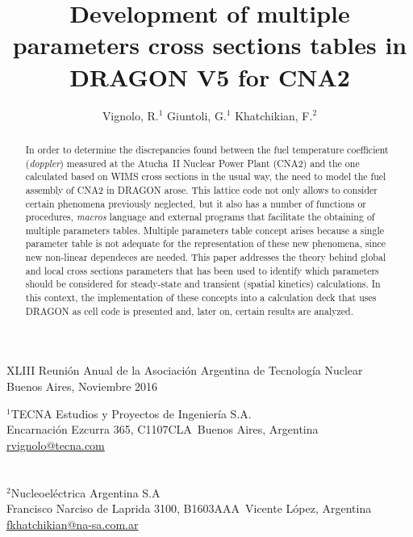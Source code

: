 \documentclass[11pt]{article}
\makeatletter
\def\affiliation#1{\def\@affiliation{#1}}
\def\maketitle{%
\thispagestyle{empty}

\null
\vspace{0.5cm plus 0.5cm minus 0.5cm}

\begin{center}
\begin{minipage}{0.8\linewidth}
\begin{center}
\Large{\textbf{\textsc{\@title}}}

\vspace{0.75cm plus 0.2cm minus 0.1cm}

\large{\@author}

\vspace{1.25cm plus 0.25cm minus 0.25cm}

\small{\@affiliation}
\vspace{1cm plus 0.2cm minus 0.2cm}

\end{center}
\end{minipage}
\end{center}

}
\makeatother
\begin{document}
\vfill

\begin{center}
\begin{small}
XLIII Reunión Anual de la Asociación Argentina de Tecnología Nuclear\\
Buenos Aires, Noviembre 2016
\end{small}
\end{center}

\pagebreak

\title{Development of multiple parameters cross sections tables in DRAGON V5 for CNA2}
\author{Vignolo, R.$^{1}$ \quad Giuntoli, G.$^{1}$ \quad Khatchikian, F.$^{2}$}
\affiliation{%
$^1$TECNA Estudios y Proyectos de Ingeniería S.A.\\
Encarnaci\'on Ezcurra 365, C1107CLA~Buenos Aires, Argentina\\
\url{rvignolo@tecna.com}\\
~\\
~\\
$^2$Nucleoeléctrica Argentina S.A\\
Francisco Narciso de Laprida 3100, B1603AAA~Vicente López, Argentina\\
\url{fkhatchikian@na-sa.com.ar}\\
}


\maketitle

\begin{abstract}
\noindent
In order to determine the discrepancies found between the fuel temperature coefficient (\emph{doppler}) measured at the Atucha~II Nuclear Power Plant (CNA2) and the one calculated based on WIMS cross sections in the usual way, the need to model the fuel assembly of CNA2 in DRAGON arose. This lattice code not only allows to consider certain phenomena previously neglected, but it also has a number of functions or procedures, \emph{macros} language and external programs that facilitate the obtaining of multiple parameters tables. Multiple parameters table concept arises because a single parameter table is not adequate for the representation of these new phenomena, since new non-linear dependeces are needed. This paper addresses the theory behind global and local cross sections parameters that has been used to identify which parameters should be considered for steady-state and transient (spatial kinetics) calculations. In this context, the implementation of these concepts into a calculation deck that uses DRAGON as cell code is presented and, later on, certain results are analyzed.
\end{abstract}
\end{document}
